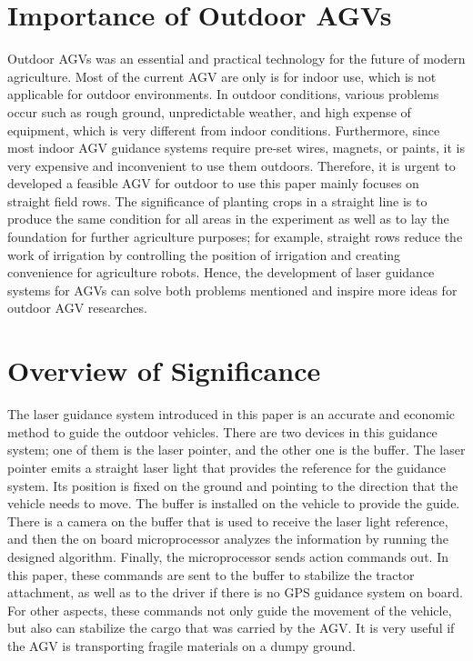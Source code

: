 \section{Importance of Outdoor AGVs}
Outdoor AGVs was an essential and practical technology for the future of modern agriculture. Most of the current AGV are only is for indoor use, which is not applicable for outdoor environments. In outdoor conditions, various problems occur such as rough ground, unpredictable weather, and high expense of equipment, which is very different from indoor conditions. Furthermore, since most indoor AGV guidance systems require pre-set wires, magnets, or paints, it is very expensive and inconvenient to use them outdoors. Therefore, it is urgent to developed a feasible AGV for outdoor to use this paper mainly focuses on straight field rows. The significance of planting crops in a straight line is to produce the same condition for all areas in the experiment as well as to lay the foundation for further agriculture purposes; for example, straight rows reduce the work of irrigation by controlling the position of irrigation and creating convenience for agriculture robots. Hence, the development of laser guidance systems for AGVs can solve both problems mentioned and inspire more ideas for outdoor AGV researches.

\section{Overview of Significance}
The laser guidance system introduced in this paper is an accurate and economic method to guide the outdoor vehicles. There are two devices in this guidance system; one of them is the laser pointer, and the other one is the buffer. The laser pointer emits a straight laser light that provides the reference for the guidance system. Its position is fixed on the ground and pointing to the direction that the vehicle needs to move. The buffer is installed on the vehicle to provide the guide. There is a camera on the buffer that is used to receive the laser light reference, and then the on board microprocessor analyzes the information by running the designed algorithm. Finally, the microprocessor sends action commands out. In this paper, these commands are sent to the buffer to stabilize the tractor attachment, as well as to the driver if there is no GPS guidance system on board. For other aspects, these commands not only guide the movement of the vehicle, but also can stabilize the cargo that was carried by the AGV. It is very useful if the AGV is transporting fragile materials on a dumpy ground.


